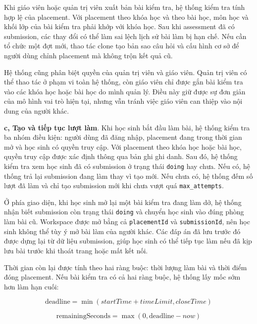 \documentclass[../DoAn.tex]{subfiles}
\begin{document}
Khi giáo viên hoặc quản trị viên xuất bản bài kiểm tra, hệ thống kiểm tra tính hợp lệ của placement. Với placement theo khóa học và theo bài học, môn học và khối lớp của bài kiểm tra phải khớp với khóa học. Sau khi assessment đã có submission, các thay đổi có thể làm sai lệch lịch sử bài làm bị hạn chế. Nếu cần tổ chức một đợt mới, thao tác clone tạo bản sao câu hỏi và cấu hình cơ sở để người dùng chỉnh placement mà không trộn kết quả cũ.

Hệ thống cũng phân biệt quyền của quản trị viên và giáo viên. Quản trị viên có thể thao tác ở phạm vi toàn hệ thống, còn giáo viên chỉ được gắn bài kiểm tra vào các khóa học hoặc bài học do mình quản lý. Điều này giữ được sự đơn giản của mô hình vai trò hiện tại, nhưng vẫn tránh việc giáo viên can thiệp vào nội dung của người khác.

\textbf{c, Tạo và tiếp tục lượt làm}. Khi học sinh bắt đầu làm bài, hệ thống kiểm tra ba nhóm điều kiện: người dùng đã đăng nhập, placement đang trong thời gian mở và học sinh có quyền truy cập. Với placement theo khóa học hoặc bài học, quyền truy cập được xác định thông qua bản ghi ghi danh. Sau đó, hệ thống kiểm tra xem học sinh đã có submission ở trạng thái \texttt{doing} hay chưa. Nếu có, hệ thống trả lại submission đang làm thay vì tạo mới. Nếu chưa có, hệ thống đếm số lượt đã làm và chỉ tạo submission mới khi chưa vượt quá \texttt{max\_attempts}.

Ở phía giao diện, khi học sinh mở lại một bài kiểm tra đang làm dở, hệ thống nhận biết submission còn trạng thái \texttt{doing} và chuyển học sinh vào đúng phòng làm bài cũ. Workspace được mở bằng cả \texttt{placementId} và \texttt{submissionId}, nên học sinh không thể tùy ý mở bài làm của người khác. Các đáp án đã lưu trước đó được dựng lại từ dữ liệu submission, giúp học sinh có thể tiếp tục làm nếu đã kịp lưu bài trước khi thoát trang hoặc mất kết nối.

Thời gian còn lại được tính theo hai ràng buộc: thời lượng làm bài và thời điểm đóng placement. Nếu bài kiểm tra có cả hai ràng buộc, hệ thống lấy mốc sớm hơn làm hạn cuối:

\begin{equation}
\mathrm{deadline} = \min(startTime + timeLimit, closeTime)
\end{equation}

\begin{equation}
\mathrm{remainingSeconds} = \max(0, \mathrm{deadline} - now)
\end{equation}
\end{document}
